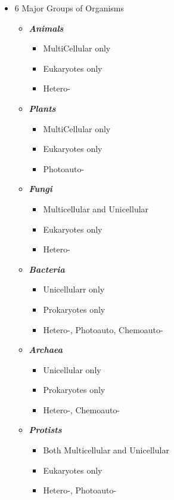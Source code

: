 \documentclass[10pt, oneside]{article}
\begin{document}
\begin{itemize}
	\item 6 Major Groups of Organisms
	
	\begin{itemize}
	\item \textbf{\emph{Animals}}
	
	\begin{itemize}
		\item MultiCellular only
		\item Eukaryotes only
		\item Hetero-
	\end{itemize}
	\item \textbf{\emph{Plants}}
	
	\begin{itemize}
		\item MultiCellular only
		\item Eukaryotes only
		\item Photoauto-
	\end{itemize}
	\item \textbf{\emph{Fungi}}
	
	\begin{itemize}
		\item Multicellular and Unicellular
		\item Eukaryotes only
		\item Hetero-
	\end{itemize}
	\item \textbf{\emph{Bacteria}}
	
	\begin{itemize}
		\item Unicellularr only
		\item Prokaryotes only
		\item Hetero-, Photoauto, Chemoauto-
	\end{itemize}
	\item \textbf{\emph{Archaea}}
	
	\begin{itemize}
		\item Unicellular only
		\item Prokaryotes only
		\item Hetero-, Chemoauto-
	\end{itemize}
	\item \textbf{\emph{Protists}}
	
	\begin{itemize}
		\item Both Multicellular and Unicellular
		\item Eukaryotes only
		\item Hetero-, Photoauto-
	\end{itemize}
	\end{itemize}
\end{itemize}
\end{document}
